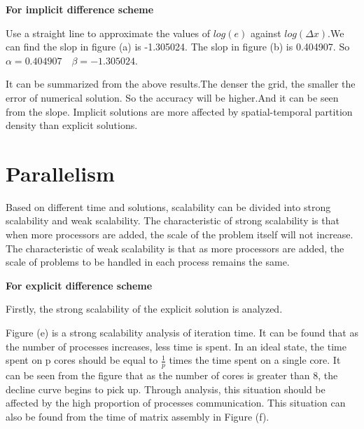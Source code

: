 \documentclass[a4paper]{article}
\begin{document}
        \textbf{For implicit difference scheme}
        \begin{figure}[H]
            \centering  
            \label{Fig.error2}
        \end{figure}
        Use a straight line to approximate the values of $log(e)$ against $log(\Delta x)$.We can find the slop in figure (a) is -1.305024. The slop in figure (b) is 0.404907. So $\alpha=0.404907 \quad \beta=-1.305024$.
       
        It can be summarized from the above results.The denser the grid, the smaller the error of numerical solution. So the accuracy will be higher.And it can be seen from the slope. Implicit solutions are more affected by spatial-temporal partition density than explicit solutions.
    \section{Parallelism}
        Based on different time and solutions, scalability can be divided into strong scalability and weak scalability. The characteristic of strong scalability is that when more processors are added, the scale of the problem itself will not increase. The characteristic of weak scalability is that as more processors are added, the scale of problems to be handled in each process remains the same.
        
        \textbf{For explicit difference scheme}

        Firstly, the strong scalability of the explicit solution is analyzed.
        \begin{figure}[H]
            \centering  
            \label{Fig.time1}
        \end{figure}
        Figure (e) is a strong scalability analysis of iteration time. It can be found that as the number of processes increases, less time is spent. In an ideal state, the time spent on p cores should be equal to $\frac{1}{p}$ times the time spent on a single core. It can be seen from the figure that as the number of cores is greater than 8, the decline curve begins to pick up. Through analysis, this situation should be affected by the high proportion of processes communication.
        This situation can also be found from the time of matrix assembly in Figure (f).
        
\end{document}
